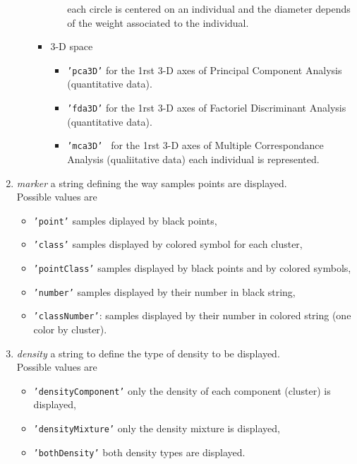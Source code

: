 \begin{enumerate}
\begin{itemize}
\begin{itemize}
\begin{itemize}
                                              each circle is centered on an individual and the diameter
                                             depends of the weight associated to the individual.
			\end{itemize}
    \item 3-D space
			\begin{itemize}
			\item {\tt 'pca3D'} for the 1rst 3-D axes of Principal Component Analysis (quantitative data).
			\item {\tt 'fda3D'} for the 1rst 3-D axes of Factoriel Discriminant Analysis (quantitative data).
			\item {\tt 'mca3D' } for the 1rst 3-D axes of Multiple Correspondance Analysis
                                             (qualiitative data) each individual is represented.
			\end{itemize}
	\end{itemize}
  \end{itemize}

  \item {\em marker} a string defining the way samples points are displayed. \\
Possible values are
  \begin{itemize}
    \item {\tt 'point'} samples diplayed by black points,
    \item {\tt 'class'} samples displayed by colored symbol for each cluster,
    \item {\tt 'pointClass'} samples displayed by black points and by colored symbols,
    \item {\tt 'number'} samples displayed by their number in black string,
    \item {\tt 'classNumber'}: samples displayed by their number in colored string (one color by cluster).
  \end{itemize}


  \item {\em density} a string to define the type of density to be displayed.\\
 Possible values are
    \begin{itemize}
    \item {\tt 'densityComponent'} only the density of each component (cluster) is displayed,
    \item {\tt 'densityMixture'} only the density mixture is displayed,
    \item {\tt 'bothDensity'} both density types are displayed.
  \end{itemize}



\end{enumerate}
